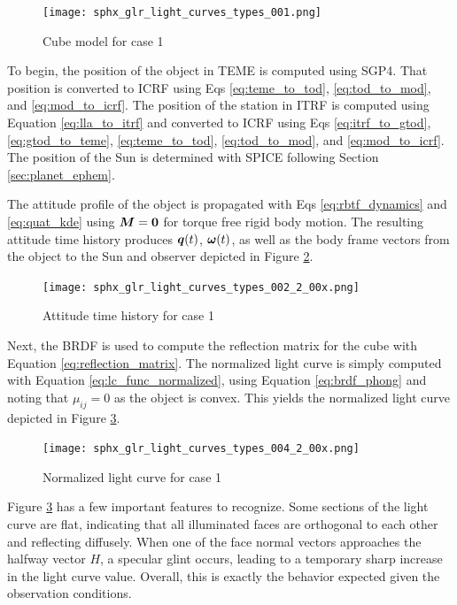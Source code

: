 \graphicspath{{/Users/liamrobinson/Documents/PyLightCurves/docs/build/html/_images}}
\begin{figure}[!htb]
  \centering
  \texttt{[image: sphx\_glr\_light\_curves\_types\_001.png]}
  \caption{Cube model for case 1}
  \label{fig:case1_obj}
\end{figure}

To begin, the position of the object in TEME is computed using SGP4. That position is converted to ICRF using Eqs \ref{eq:teme_to_tod}, \ref{eq:tod_to_mod}, and \ref{eq:mod_to_icrf}. The position of the station in ITRF is computed using Equation \ref{eq:lla_to_itrf} and converted to ICRF using Eqs \ref{eq:itrf_to_gtod}, \ref{eq:gtod_to_teme}, \ref{eq:teme_to_tod}, \ref{eq:tod_to_mod}, and \ref{eq:mod_to_icrf}. The position of the Sun is determined with SPICE following Section \ref{sec:planet_ephem}. 

The attitude profile of the object is propagated with Eqs \ref{eq:rbtf_dynamics} and \ref{eq:quat_kde} using $\bm{M} = \mathbf{0}$ for torque free rigid body motion. The resulting attitude time history produces $\bm{q}(t)$, $\bm{\omega}(t)$, as well as the body frame vectors from the object to the Sun and observer depicted in Figure \ref{fig:case1_attitude}.

\begin{figure}[!htb]
  \centering
  \texttt{[image: sphx\_glr\_light\_curves\_types\_002\_2\_00x.png]}
  \caption{Attitude time history for case 1}
  \label{fig:case1_attitude}
\end{figure}

Next, the BRDF is used to compute the reflection matrix for the cube with Equation \ref{eq:reflection_matrix}. The normalized light curve is simply computed with Equation \ref{eq:lc_func_normalized}, using Equation \ref{eq:brdf_phong} and noting that $\mu_{ij} = 0$ as the object is convex. This yields the normalized light curve depicted in Figure \ref{fig:case1_lc}.

\begin{figure}[!htb]
  \centering
  \texttt{[image: sphx\_glr\_light\_curves\_types\_004\_2\_00x.png]}
  \caption{Normalized light curve for case 1}
  \label{fig:case1_lc}
\end{figure}

Figure \ref{fig:case1_lc} has a few important features to recognize. Some sections of the light curve are flat, indicating that all illuminated faces are orthogonal to each other and reflecting diffusely. When one of the face normal vectors approaches the halfway vector $H$, a specular glint occurs, leading to a temporary sharp increase in the light curve value. Overall, this is exactly the behavior expected given the observation conditions.

